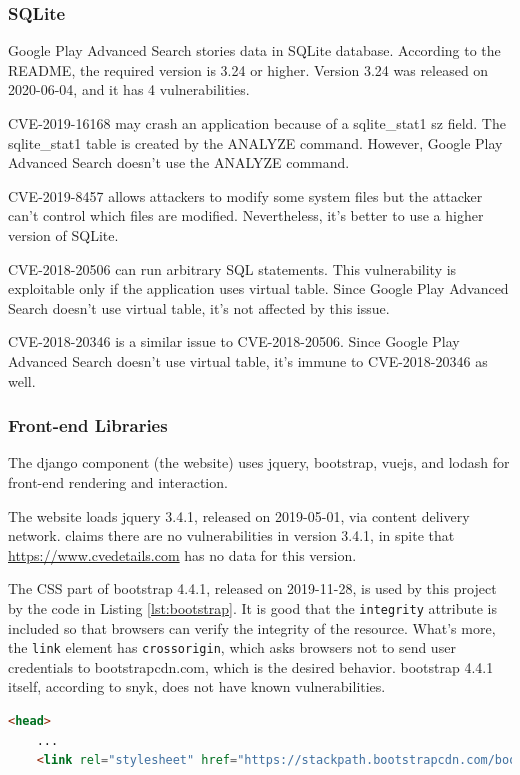 \documentclass[12pt, a4paper]{article}
\newcommand{\code}[1]{\texttt{#1}}
\begin{document}
\subsubsection{SQLite}
Google Play Advanced Search stories data in SQLite database. According to the README, the required version is 3.24 or higher. Version 3.24 was released on 2020-06-04, and it has 4 vulnerabilities.

CVE-2019-16168 may crash an application because of a sqlite\_stat1 sz field. The sqlite\_stat1 table is created by the ANALYZE command. However, Google Play Advanced Search doesn't use the ANALYZE command.

CVE-2019-8457 allows attackers to modify some system files but the attacker can't control which files are modified. Nevertheless, it's better to use a higher version of SQLite.

CVE-2018-20506 can run arbitrary SQL statements. This vulnerability is exploitable only if the application uses virtual table. Since Google Play Advanced Search doesn't use virtual table, it's not affected by this issue.

CVE-2018-20346 is a similar issue to CVE-2018-20506. Since Google Play Advanced Search doesn't use virtual table, it's immune to CVE-2018-20346 as well.

\subsubsection{Front-end Libraries}
The django component (the website) uses jquery, bootstrap, vuejs, and lodash for front-end rendering and interaction.

The website loads jquery 3.4.1, released on 2019-05-01, via content delivery network. \cite{jquery-341} claims there are no vulnerabilities in version 3.4.1, in spite that \url{https://www.cvedetails.com} has no data for this version.


The CSS part of bootstrap 4.4.1, released on 2019-11-28, is used by this project by the code in Listing \ref{lst:bootstrap}. It is good that the \code{integrity} attribute is included so that browsers can verify the integrity of the resource. What's more, the \code{link} element has \code{crossorigin}, which asks browsers not to send user credentials to bootstrapcdn.com, which is the desired behavior. bootstrap 4.4.1 itself, according to snyk, does not have known vulnerabilities.


\begin{lstlisting}[language=html, frame=tb, caption=The code to load bootstrap, label=lst:bootstrap]
<head>
	...
	<link rel="stylesheet" href="https://stackpath.bootstrapcdn.com/bootstrap/4.4.1/css/bootstrap.min.css" integrity="sha384-Vkoo8x4CGsO3+Hhxv8T/Q5PaXtkKtu6ug5TOeNV6gBiFeWPGFN9MuhOf23Q9Ifjh" crossorigin="anonymous">
\end{lstlisting}
\end{document}
